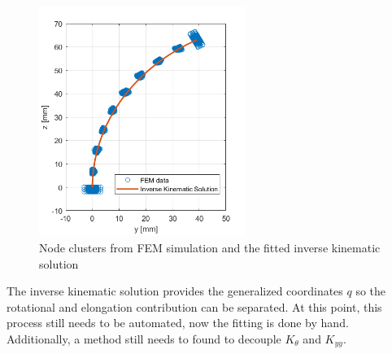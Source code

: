 \begin{figure}[H]
    \centering
    \includegraphics[width = 0.6\textwidth]{Figures/Chapter3/kinfit.png}
    \caption{Node clusters from FEM simulation and the fitted inverse kinematic solution}
    \label{fig4:midnodesfit}
\end{figure}

The inverse kinematic solution provides the generalized coordinates $q$ so the rotational and elongation contribution can be separated. At this point, this process still needs to be automated, now the fitting is done by hand. Additionally, a method still needs to found to decouple $K_{\theta}$ and $K_{yy}$.




